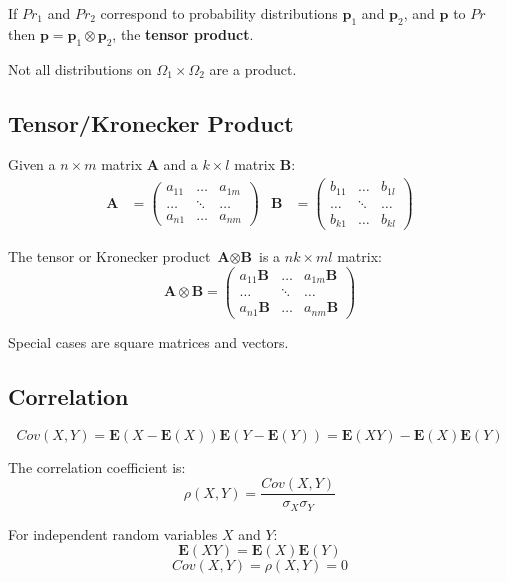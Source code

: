 \documentclass[11pt]{article}
\begin{document}
If $Pr_1$ and $Pr_2$ correspond to probability distributions $\textbf{p}_1$ and $\textbf{p}_2$, and $\textbf{p}$ to $Pr$ then $\textbf{p} = \textbf{p}_1 \otimes \textbf{p}_2$, the \textbf{tensor product}.

Not all distributions on $\Omega_1 \times \Omega_2$ are a product.

\subsection{Tensor/Kronecker Product}
Given a $n \times m$ matrix $\textbf{A}$ and a $k \times l$ matrix $\textbf{B}$:
\begin{align*}
  \textbf{A} &=
  \begin{pmatrix}
    a_{11} & \ldots & a_{1m} \\
    \dots & \ddots & \dots \\
    a_{n1} & \ldots & a_{nm}
  \end{pmatrix}
  &
  \textbf{B} &=
  \begin{pmatrix}
    b_{11} & \ldots & b_{1l} \\
    \dots & \ddots & \dots \\
    b_{k1} & \ldots & b_{kl}
  \end{pmatrix}
\end{align*}

The tensor or Kronecker product $\textbf{A} \otimes \textbf{B}$ is a $nk \times ml$ matrix:
\[
  \textbf{A} \otimes \textbf{B} = 
  \begin{pmatrix}
    a_{11}\textbf{B} & \ldots & a_{1m}\textbf{B} \\
    \dots & \ddots & \dots \\
    a_{n1}\textbf{B} & \ldots & a_{nm}\textbf{B}
  \end{pmatrix}
\]

Special cases are square matrices and vectors.

\subsection{Correlation}
\[
  Cov(X, Y) = \textbf{E}(X - \textbf{E}(X))\textbf{E}(Y - \textbf{E}(Y)) = \textbf{E}(XY) - \textbf{E}(X)\textbf{E}(Y)
\]

The correlation coefficient is:
\[
  \rho(X, Y) = \frac{Cov(X, Y)}{\sigma_X \sigma_Y}
\]

For independent random variables $X$ and $Y$:
\[
  \textbf{E}(XY) = \textbf{E}(X)\textbf{E}(Y)
\]
\[
  Cov(X, Y) = \rho(X, Y) = 0
\]
\end{document}
